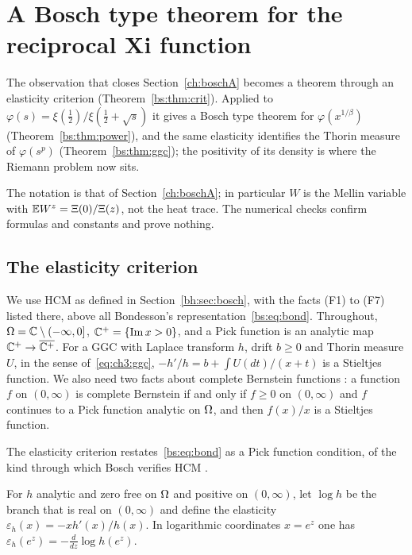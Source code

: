 \section{A Bosch type theorem for the reciprocal Xi function}\label{ch:boschB}

\label{bs:sec:intro}The observation that closes Section~\ref{ch:boschA} becomes a theorem through an elasticity criterion (Theorem~\ref{bs:thm:crit}). Applied to $\varphi(s)=\xi(\frac12)/\xi(\frac12+\sqrt s)$ it gives a Bosch type theorem for $\varphi(x^{1/\beta})$ (Theorem~\ref{bs:thm:power}), and the same elasticity identifies the Thorin measure of $\varphi(s^p)$ (Theorem~\ref{bs:thm:ggc}); the positivity of its density is where the Riemann problem now sits.

The notation is that of Section~\ref{ch:boschA}; in particular $W$ is the Mellin variable with $\mathbb{E} W^z=\Xi(0)/\Xi(z)$, not the heat trace. The numerical checks confirm formulas and constants and prove nothing.

\subsection{The elasticity criterion}\label{bs:sec:crit}

\label{bs:sec:facts}We use HCM as defined in Section~\ref{bh:sec:bosch}, with the facts (F1) to (F7) listed there, above all Bondesson's representation~\eqref{bs:eq:bond}. Throughout, $\Omega=\mathbb{C}\setminus(-\infty,0]$, $\mathbb{C}^+=\{\operatorname{Im} x>0\}$, and a Pick function is an analytic map $\mathbb{C}^+\to\overline{\mathbb{C}^+}$. For a GGC with Laplace transform $h$, drift $b\ge0$ and Thorin measure $U$, in the sense of~\eqref{eq:ch3:ggc}, $-h'/h=b+\int U(dt)/(x+t)$ is a Stieltjes function. We also need two facts about complete Bernstein functions \cite[Theorem 6.2]{boSSV}: a function $f$ on $(0,\infty)$ is complete Bernstein if and only if $f\ge0$ on $(0,\infty)$ and $f$ continues to a Pick function analytic on $\Omega$, and then $f(x)/x$ is a Stieltjes function.

The elasticity criterion restates~\eqref{bs:eq:bond} as a Pick function condition, of the kind through which Bosch verifies HCM \cite[Section 2.2]{boBosch}.

\begin{definition}
For $h$ analytic and zero free on $\Omega$ and positive on $(0,\infty)$, let $\log h$ be the branch that is real on $(0,\infty)$ and define the elasticity $\varepsilon_h(x)=-xh'(x)/h(x)$. In logarithmic coordinates $x=e^z$ one has $\varepsilon_h(e^z)=-\frac{d}{dz}\log h(e^z)$.
\end{definition}

